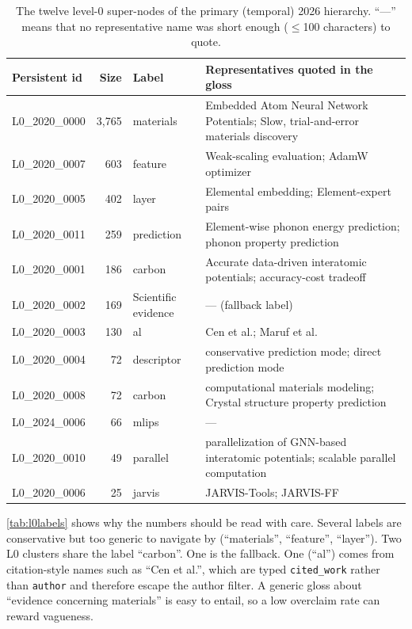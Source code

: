 \documentclass[11pt,a4paper]{article}
\newcommand{\Cref}[1]{\autoref{#1}}
\theoremstyle{remark}
\newcommand{\code}[1]{\texttt{\small #1}}
\begin{document}
\begin{table}[!htbp]
\centering
\caption{The twelve level-0 super-nodes of the primary (temporal) 2026 hierarchy.
``---'' means that no representative name was short enough ($\le$100 characters) to quote.}
\label{tab:l0labels}
\small
\begin{tabularx}{\linewidth}{lrlX}
\toprule
Persistent id & Size & Label & Representatives quoted in the gloss\\
\midrule
L0\_2020\_0000 & 3{,}765 & materials & Embedded Atom Neural Network Potentials; Slow, trial-and-error materials discovery\\
L0\_2020\_0007 & 603 & feature & Weak-scaling evaluation; AdamW optimizer\\
L0\_2020\_0005 & 402 & layer & Elemental embedding; Element-expert pairs\\
L0\_2020\_0011 & 259 & prediction & Element-wise phonon energy prediction; phonon property prediction\\
L0\_2020\_0001 & 186 & carbon & Accurate data-driven interatomic potentials; accuracy-cost tradeoff\\
L0\_2020\_0002 & 169 & Scientific evidence & --- (fallback label)\\
L0\_2020\_0003 & 130 & al & Cen et al.; Maruf et al.\\
L0\_2020\_0004 & 72 & descriptor & conservative prediction mode; direct prediction mode\\
L0\_2020\_0008 & 72 & carbon & computational materials modeling; Crystal structure property prediction\\
L0\_2024\_0006 & 66 & mlips & ---\\
L0\_2020\_0010 & 49 & parallel & parallelization of GNN-based interatomic potentials; scalable parallel computation\\
L0\_2020\_0006 & 25 & jarvis & JARVIS-Tools; JARVIS-FF\\
\bottomrule
\end{tabularx}
\end{table}

\Cref{tab:l0labels} shows why the numbers should be read with care. Several labels are
conservative but too generic to navigate by (``materials'', ``feature'', ``layer''). Two
L0 clusters share the label ``carbon''. One is the fallback. One (``al'') comes from
citation-style names such as ``Cen et al.'', which are typed \code{cited\_work} rather than
\code{author} and therefore escape the author filter. A generic gloss about ``evidence concerning
materials'' is easy to entail, so a low overclaim rate can reward vagueness.
\end{document}
